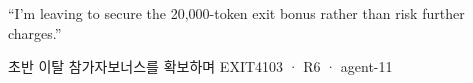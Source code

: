   {“I’m leaving to secure the 20,000-token exit bonus rather than risk further charges.”}
  {\ground
   \begin{scope}[shift={(4.15,1.45)},scale=1.15]\end{scope}%
   }
  {초반 이탈 참가자}{보너스를 확보하며 EXIT}{4103 · R6 · agent-11}
